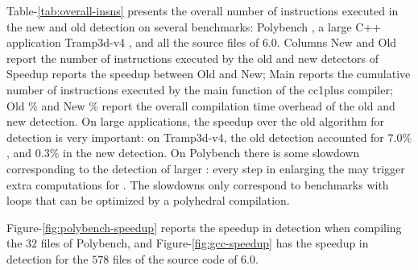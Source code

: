 \documentclass{sig-alternate}
\begin{document}
Table-\ref{tab:overall-insns} presents the overall number of instructions
executed in the new and old \SCoP{} detection on several benchmarks: Polybench
\cite{polybench}, a large C++ application Tramp3d-v4 \cite{richi}, and all the
source files of \GCC{} 6.0.  Columns New and Old report the number of instructions
executed by the old and new \SCoP{} detectors of \GCC{;} Speedup reports the speedup
between Old and New; Main reports the cumulative number of instructions executed
by the main function of the \GCC{} cc1plus compiler; Old \% and New \% report the
overall compilation time overhead of the old and new \SCoP{} detection.  On large
applications, the speedup over the old algorithm for \SCoP{} detection is very
important: on Tramp3d-v4, the old \SCoP{} detection accounted for $7.0\%$, and
$0.3\%$ in the new \SCoP{} detection.  On Polybench there is some slowdown
corresponding to the detection of larger : every step in enlarging the \SCoP{}
may trigger extra computations for .  The slowdowns only correspond to
benchmarks with loops that can be optimized by a polyhedral compilation.

Figure-\ref{fig:polybench-speedup} reports the speedup in \SCoP{} detection when
compiling the $32$ files of Polybench, and Figure-\ref{fig:gcc-speedup} has the
speedup in \SCoP{} detection for the $578$ files of the source code of \GCC{} 6.0.

\begin{table}[h!]
  \begin{center}
  \end{center}
  \caption{Overall number of instructions spent in \SCoP{} detection.}
  \label{tab:overall-insns}
\end{table}
\end{document}
